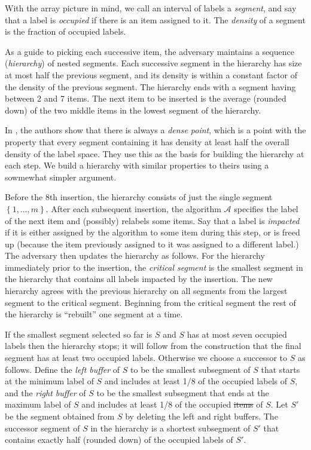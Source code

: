 \documentclass[unicode,review]{siamart1116}
\newcommand{\A}{\mathcal{A}}
\newcommand{\natInt}[2]{ \left\{ #1, \dotsc, #2 \right\} }
\numberwithin{theorem}{section}
\providecommand{\DIFadd}[1]{{\protect\color{blue}\uwave{#1}}} %
\providecommand{\DIFdel}[1]{{\protect\color{red}\sout{#1}}}                      %
\providecommand{\DIFaddbegin}{} %
\providecommand{\DIFaddend}{} %
\providecommand{\DIFdelbegin}{} %
\providecommand{\DIFdelend}{} %
\newcommand{\DIFscaledelfig}{0.5}
\newlength{\DIFdelgraphicswidth} %
\newlength{\DIFdelgraphicsheight} %
\newcommand{\DIFaddincludegraphics}[2][]{{\color{blue}\fbox{\DIFOincludegraphics[#1]{#2}}}} %
\newcommand{\DIFdelincludegraphics}[2][]{%
\sbox{\DIFdelgraphicsbox}{\DIFOincludegraphics[#1]{#2}}%
\settoboxwidth{\DIFdelgraphicswidth}{\DIFdelgraphicsbox} %
\settoboxtotalheight{\DIFdelgraphicsheight}{\DIFdelgraphicsbox} %
\scalebox{\DIFscaledelfig}{%
\parbox[b]{\DIFdelgraphicswidth}{\usebox{\DIFdelgraphicsbox}\\[-\baselineskip] \rule{\DIFdelgraphicswidth}{0em}}\llap{\resizebox{\DIFdelgraphicswidth}{\DIFdelgraphicsheight}{%
\setlength{\unitlength}{\DIFdelgraphicswidth}%
\begin{picture}(1,1)%
\thicklines\linethickness{2pt} %
{\color[rgb]{1,0,0}\put(0,0){\framebox(1,1){}}}%
{\color[rgb]{1,0,0}\put(0,0){\line( 1,1){1}}}%
{\color[rgb]{1,0,0}\put(0,1){\line(1,-1){1}}}%
\end{picture}%
}\hspace*{3pt}}} %
} %
\DeclareRobustCommand{\DIFaddbegin}{\DIFOaddbegin \let\includegraphics\DIFaddincludegraphics} %
\DeclareRobustCommand{\DIFaddend}{\DIFOaddend \let\includegraphics\DIFOincludegraphics} %
\DeclareRobustCommand{\DIFdelbegin}{\DIFOdelbegin \let\includegraphics\DIFdelincludegraphics} %
\DeclareRobustCommand{\DIFdelend}{\DIFOaddend \let\includegraphics\DIFOincludegraphics} %
\begin{document}
With the array picture in mind,
we  call an interval of labels a \emph{segment}, and say that a label is {\em occupied} if there is an item assigned to it.
The \emph{density} of a segment is the fraction of occupied labels.

As a guide to picking each successive item, the adversary maintains a sequence (\emph{hierarchy}) of nested segments.  Each successive segment in the hierarchy
has size at most half the previous segment, and its density  is within a constant factor of the density of the previous segment.
The hierarchy ends with a segment having between 2 and 7 items.  The next item to be inserted is the average (rounded down)
of the two middle items in the lowest segment of the hierarchy.

In \cite{DSZ04}, the authors show that there is always a \emph{dense point}, which is
a point  with the property that every segment containing it
has density at least half the overall density of the label space.  They use this as the basis for building the hierarchy at each
step.
We build a hierarchy with similar properties to theirs using a sowmewhat simpler argument.


Before the 8th insertion, the hierarchy consists of just the single segment $\natInt{1}{m}$.
After each subsequent insertion,
the algorithm $\A$ specifies the label of the next item and (possibly) relabels some items. Say that a label is {\em impacted} if
it is either assigned by the algorithm to some item during this step, or is freed up (because the item previously
assigned to it was  assigned to a different label.) The adversary then updates the hierarchy as follows.  For the hierarchy immediately prior to the insertion, the {\em critical segment} is the smallest segment in the hierarchy that contains all 
labels impacted by the insertion.
The new hierarchy agrees with the previous hierarchy on all segments from the largest segment to 
the critical segment.   Beginning from the critical segment the rest of the hierarchy is ``rebuilt'' one segment at a time.

If the smallest segment selected so far is $S$ and $S$ has at most seven occupied labels then
the hierarchy stops; it will follow from the construction that the final segment has at least
two occupied labels.  Otherwise we choose a successor to $S$ as follows.
Define the
{\em left buffer} of $S$
to be the smallest subsegment of $S$ that starts at the minimum label of $S$ and
includes at least 1/8 of the occupied labels of $S$, and the {\em right buffer} of $S$ to be the smallest subsegment that ends at the maximum label of $S$
and includes at least 1/8 of the occupied \DIFdelbegin \DIFdel{items }\DIFdelend \DIFaddbegin \DIFadd{labels }\DIFaddend of $S$.
Let $S'$ be the segment obtained from $S$ by
deleting the left and right buffers. The successor segment of $S$ in the hierarchy is
a shortest subsegment of $S'$ that contains exactly half (rounded down) of the occupied labels of $S'$.
\end{document}
